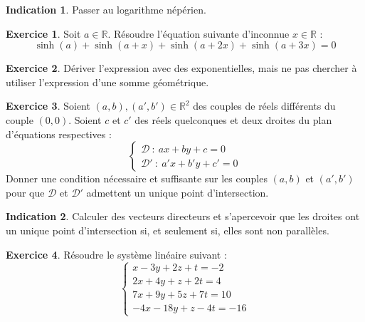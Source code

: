 \documentclass[french]{book}
\newcommand{\R}{\mathbb{R}}
\theoremstyle{definition}
\newtheorem{ex}{Exercice}[chapter]
\theoremstyle{theorem}
\newtheorem*{ind}{Indication}
\theoremstyle{remark}
\begin{document}
\begin{ind}
	Passer au logarithme népérien.
\end{ind}

\begin{ex}
	Soit $a\in\R$. Résoudre l'équation suivante d'inconnue $x\in\R$ : $$\sinh(a)+\sinh(a+x)+\sinh(a+2x)+\sinh(a+3x)=0$$
\end{ex}

\begin{ex}
	Dériver l'expression avec des exponentielles, mais ne pas chercher à utiliser l'expression d'une somme géométrique.
\end{ex}

\begin{ex}
	Soient $(a,b),(a',b')\in\R^2$ des couples de réels différents du couple $(0,0)$. Soient $c$ et $c'$ des réels quelconques et deux droites du plan d'équations respectives : $$\begin{cases}
		\mathcal{D}\ : \ ax+by+c=0 \\
		\mathcal{D}'\ : \ a'x+b'y+c'=0
	\end{cases}$$ Donner une condition nécessaire et suffisante sur les couples $(a,b)$ et $(a',b')$ pour que $\mathcal{D}$ et $\mathcal{D}'$ admettent un unique point d'intersection.
\end{ex}

\begin{ind}
	Calculer des vecteurs directeurs et s'apercevoir que les droites ont un unique point d'intersection si, et seulement si, elles sont non parallèles.
\end{ind}

\begin{ex}
	Résoudre le système linéaire suivant : $$\begin{cases}
		x-3y+2z+t=-2\\
		2x+4y+z+2t=4 \\
		7x+9y+5z+7t=10 \\
		-4x-18y+z-4t=-16
	\end{cases}$$
\end{ex}
\end{document}
